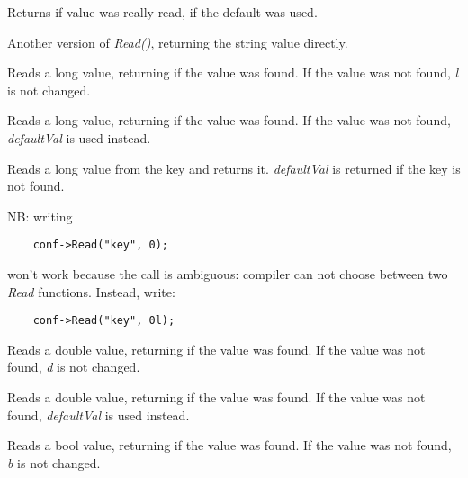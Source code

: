 Returns \true if value was really read, \false if the default was used.


Another version of {\it Read()}, returning the string value directly.


Reads a long value, returning \true if the value was found. If the value was
not found, {\it l} is not changed.


Reads a long value, returning \true if the value was found. If the value was
not found, {\it defaultVal} is used instead.


Reads a long value from the key and returns it. {\it defaultVal} is returned
if the key is not found.

NB: writing

{\small
\begin{verbatim}
    conf->Read("key", 0);
\end{verbatim}
}

won't work because the call is ambiguous: compiler can not choose between two
{\it Read} functions. Instead, write:

{\small
\begin{verbatim}
    conf->Read("key", 0l);
\end{verbatim}
}


Reads a double value, returning \true if the value was found. If the value was
not found, {\it d} is not changed.


Reads a double value, returning \true if the value was found. If the value was
not found, {\it defaultVal} is used instead.


Reads a bool value, returning \true if the value was found. If the value was
not found, {\it b} is not changed.

